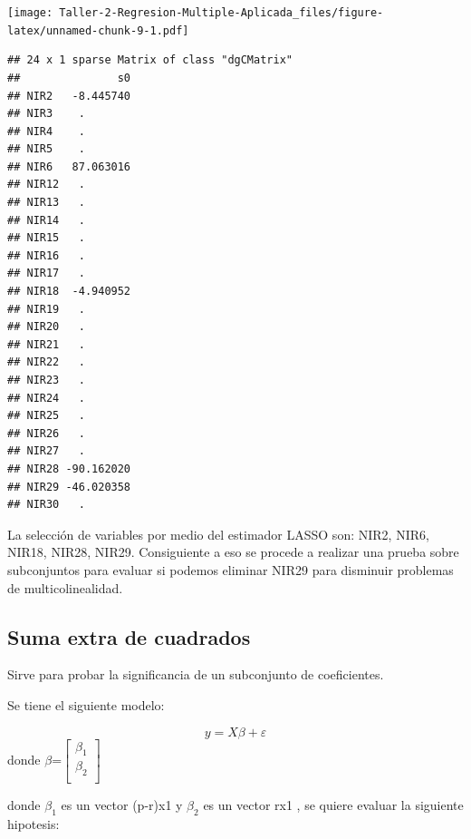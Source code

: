 \documentclass[
]{article}
\newenvironment{Shaded}{\begin{snugshade}}{\end{snugshade}}
\newcommand{\AttributeTok}[1]{\textcolor[rgb]{0.77,0.63,0.00}{#1}}
\newcommand{\DecValTok}[1]{\textcolor[rgb]{0.00,0.00,0.81}{#1}}
\newcommand{\FloatTok}[1]{\textcolor[rgb]{0.00,0.00,0.81}{#1}}
\newcommand{\FunctionTok}[1]{\textcolor[rgb]{0.00,0.00,0.00}{#1}}
\newcommand{\NormalTok}[1]{#1}
\newcommand{\OtherTok}[1]{\textcolor[rgb]{0.56,0.35,0.01}{#1}}
\newcommand{\SpecialCharTok}[1]{\textcolor[rgb]{0.00,0.00,0.00}{#1}}
\begin{document}
\texttt{[image: Taller-2-Regresion-Multiple-Aplicada\_files/figure-latex/unnamed-chunk-9-1.pdf]}

\begin{Shaded}
\end{Shaded}

\begin{verbatim}
## 24 x 1 sparse Matrix of class "dgCMatrix"
##               s0
## NIR2   -8.445740
## NIR3    .       
## NIR4    .       
## NIR5    .       
## NIR6   87.063016
## NIR12   .       
## NIR13   .       
## NIR14   .       
## NIR15   .       
## NIR16   .       
## NIR17   .       
## NIR18  -4.940952
## NIR19   .       
## NIR20   .       
## NIR21   .       
## NIR22   .       
## NIR23   .       
## NIR24   .       
## NIR25   .       
## NIR26   .       
## NIR27   .       
## NIR28 -90.162020
## NIR29 -46.020358
## NIR30   .
\end{verbatim}

La selección de variables por medio del estimador LASSO son: NIR2, NIR6,
NIR18, NIR28, NIR29. Consiguiente a eso se procede a realizar una prueba
sobre subconjuntos para evaluar si podemos eliminar NIR29 para disminuir
problemas de multicolinealidad.

\hypertarget{suma-extra-de-cuadrados}{%
\subsection{Suma extra de cuadrados}\label{suma-extra-de-cuadrados}}

Sirve para probar la significancia de un subconjunto de coeficientes.

Se tiene el siguiente modelo:

\[y = X\beta+\varepsilon\] donde
\(\beta\)=\(\begin{bmatrix} \beta_{1}\\ \beta_{2} \\ \end{bmatrix}\)

donde \(\beta_1\) es un vector (p-r)x1 y \(\beta_2\) es un vector rx1 ,
se quiere evaluar la siguiente hipotesis:
\end{document}
